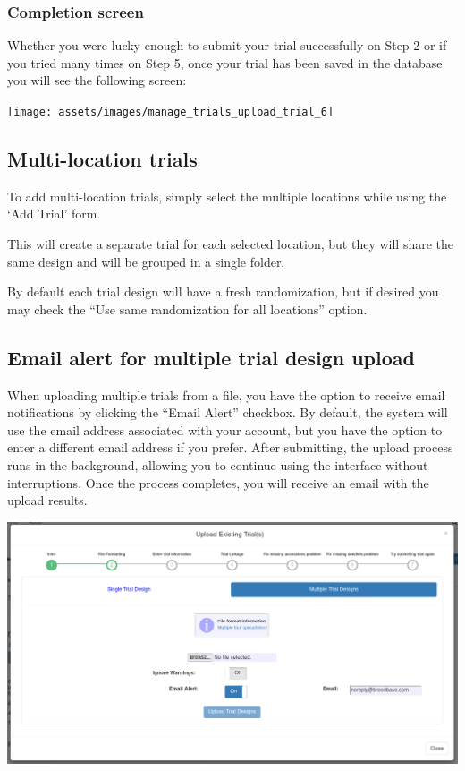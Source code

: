 \documentclass[
  12pt,
]{book}
\begin{document}
\hypertarget{completion-screen}{%
\subsubsection*{Completion screen}\label{completion-screen}}


Whether you were lucky enough to submit your trial successfully on Step 2 or if you tried many times on Step 5, once your trial has been saved in the database you will see the following screen:

\begin{center}\texttt{[image: assets/images/manage\_trials\_upload\_trial\_6]} \end{center}

\hypertarget{multi-location-trials}{%
\subsection{Multi-location trials}\label{multi-location-trials}}

To add multi-location trials, simply select the multiple locations while using the `Add Trial' form.

This will create a separate trial for each selected location, but they will share the same design and will be grouped in a single folder.

By default each trial design will have a fresh randomization, but if desired you may check the ``Use same randomization for all locations'' option.

\hypertarget{email-alert-for-multiple-trial-design-upload}{%
\subsection{Email alert for multiple trial design upload}\label{email-alert-for-multiple-trial-design-upload}}

When uploading multiple trials from a file, you have the option to receive email notifications by clicking the ``Email Alert'' checkbox. By default, the system will use the email address associated with your account, but you have the option to enter a different email address if you prefer. After submitting, the upload process runs in the background, allowing you to continue using the interface without interruptions. Once the process completes, you will receive an email with the upload results.

\begin{center}\includegraphics[width=0.95\linewidth]{assets/images/multiple_trial_upload_with_email} \end{center}
\end{document}
